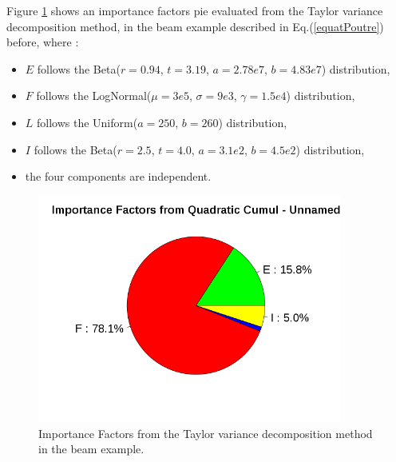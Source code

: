 Figure \ref{quadraticCumulImportanceFactors}  shows an importance factors pie evaluated from the Taylor variance decomposition method, in the beam example described in Eq.(\ref{equatPoutre}) before, where :
\begin{itemize}
\item $E$ follows the Beta($r = 0.94$, $t = 3.19$, $a = 2.78e7$, $b = 4.83e7$) distribution,
\item $F$ follows the LogNormal($\mu = 3e5$, $\sigma = 9e3$, $\gamma = 1.5e4$)  distribution,
\item $L$ follows the Uniform($a = 250$, $b=260$) distribution,
\item $I$ follows the Beta($r = 2.5$, $t = 4.0$, $a = 3.1e2$, $b = 4.5e2$) distribution,
\item the four components are independent.
\end{itemize}



\begin{figure}[H]
  \begin{center}
    \includegraphics[width=10cm]{ImportanceFactorsDrawingQuadraticCumul.png}
  \end{center}
  \caption{Importance Factors from the Taylor variance decomposition method in the beam example.}
  \label{quadraticCumulImportanceFactors}
\end{figure}



